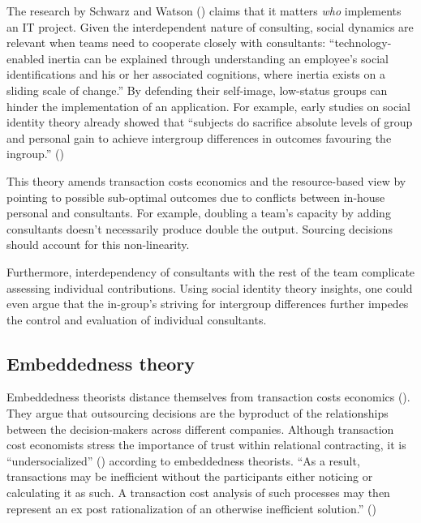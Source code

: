 \documentclass[
  man,floatsintext]{apa6}
\begin{document}
The research by Schwarz and Watson () claims that it matters \emph{who} implements an IT project. Given the interdependent nature of consulting, social dynamics are relevant when teams need to cooperate closely with consultants: ``technology-enabled inertia can be explained through understanding an employee's social identifications and his or her associated cognitions, where inertia exists on a sliding scale of change.'' By defending their self-image, low-status groups can hinder the implementation of an application. For example, early studies on social identity theory already showed that ``subjects do sacrifice absolute levels of group and personal gain to achieve intergroup differences in outcomes favouring the ingroup.'' ()

This theory amends transaction costs economics and the resource-based view by pointing to possible sub-optimal outcomes due to conflicts between in-house personal and consultants. For example, doubling a team's capacity by adding consultants doesn't necessarily produce double the output. Sourcing decisions should account for this non-linearity.

Furthermore, interdependency of consultants with the rest of the team complicate assessing individual contributions. Using social identity theory insights, one could even argue that the in-group's striving for intergroup differences further impedes the control and evaluation of individual consultants.

\subsection{Embeddedness theory}\label{embeddedness-theory}

Embeddedness theorists distance themselves from transaction costs economics (). They argue that outsourcing decisions are the byproduct of the relationships between the decision-makers across different companies. Although transaction cost economists stress the importance of trust within relational contracting, it is ``undersocialized'' () according to embeddedness theorists. ``As a result, transactions may be inefficient without the participants either noticing or calculating it as such. A transaction cost analysis of such processes may then represent an ex post rationalization of an otherwise inefficient solution.'' ()
\end{document}
